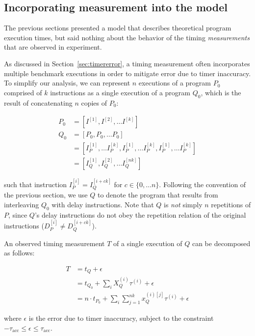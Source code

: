 \documentclass[conference]{IEEEtran}
\begin{document}
\subsection{Incorporating measurement into the model}

The previous sections presented a model that describes theoretical program execution times,
but said nothing about the behavior of the timing \textit{measurements} that are observed in
experiment.

As discussed in Section~\ref{sec:timererror}, a timing measurement often incorporates
multiple benchmark executions in order to mitigate error due to timer inaccuracy. To
simplify our analysis, we can represent $n$ executions of a program $P_0$ comprised of $k$
instructions as a single execution of a program $Q_0$, which is the result of concatenating
$n$ copies of $P_0$:

\begin{align}
P_0 &= \left[I^{[1]}, I^{[2]}, \dots I^{[k]} \right] \\ \nonumber
Q_0 &= \left[P_0, P_0, \dots P_0 \right] \\ \nonumber
    &= \left[I_{P}^{[1]}, \dots I_{P}^{[k]}, I_{P}^{[1]}, \dots I_{P}^{[k]}, I_{P}^{[1]}, \dots I_{P}^{[k]} \right] \\ \nonumber
    &= \left[I_{Q}^{[1]}, I_{Q}^{[2]}, \dots I_{Q}^{[nk]} \right]
\end{align}

such that instruction $I_{P}^{[i]} = I_{Q}^{[i + ck]}$ for $c \in \{0, \dots n\}$. Following
the convention of the previous section, we use $Q$ to denote the program that results from
interleaving $Q_0$ with delay instructions. Note that $Q$ is \textit{not} simply $n$
repetitions of $P$, since $Q$'s delay instructions do not obey the repetition relation
of the original instructions ($D_{P}^{[i]} \ne D_{Q}^{[i + ck]}$).

An observed timing measurement $T$ of a single execution of $Q$ can be decomposed as
follows:

\begin{align}
    T &= t_{Q} + \epsilon \\ \nonumber
      &= t_{Q_0} + \sum_{i} X_Q^{(i)} \tau^{(i)} + \epsilon \\ \nonumber
      &= n \cdot t_{P_0} + \sum_{i} \sum_{j=1}^{nk} x_Q^{(i)[j]} \tau^{(i)} + \epsilon
\end{align}

where $\epsilon$ is the error due to timer inaccuracy, subject to the
constraint $-\tau_{\textrm{acc}} \le \epsilon \le \tau_{\textrm{acc}}$.
\end{document}
